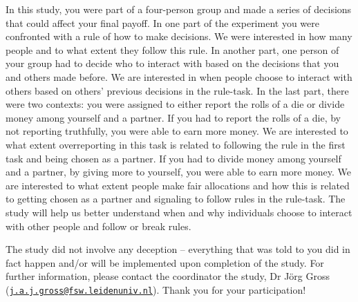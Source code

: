 \documentclass[man]{apa6}
\begin{document}
In this study, you were part of a four-person group and made a series of
decisions that could affect your final payoff. In one part of the
experiment you were confronted with a rule of how to make decisions. We
were interested in how many people and to what extent they follow this
rule. In another part, one person of your group had to decide who to
interact with based on the decisions that you and others made before. We
are interested in when people choose to interact with others based on
others' previous decisions in the rule-task. In the last part, there
were two contexts: you were assigned to either report the rolls of a die
or divide money among yourself and a partner. If you had to report the
rolls of a die, by not reporting truthfully, you were able to earn more
money. We are interested to what extent overreporting in this task is
related to following the rule in the first task and being chosen as a
partner. If you had to divide money among yourself and a partner, by
giving more to yourself, you were able to earn more money. We are
interested to what extent people make fair allocations and how this is
related to getting chosen as a partner and signaling to follow rules in
the rule-task. The study will help us better understand when and why
individuals choose to interact with other people and follow or break
rules.

The study did not involve any deception -- everything that was told to
you did in fact happen and/or will be implemented upon completion of the
study. For further information, please contact the coordinator the
study, Dr Jörg Gross
(\href{mailto:j.a.j.gross@fsw.leidenuniv.nl}{\nolinkurl{j.a.j.gross@fsw.leidenuniv.nl}}).
Thank you for your participation!
\end{document}
